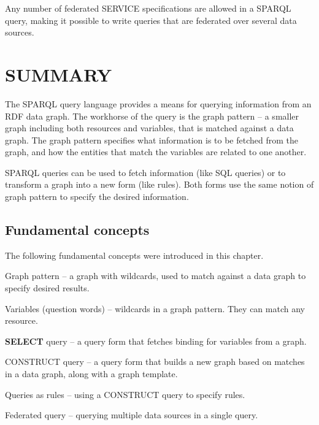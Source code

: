 Any number of federated SERVICE specifications are allowed in a SPARQL
query, making it possible to write queries that are federated over
several data sources.

\section{SUMMARY}

The SPARQL query language provides a means for querying information from
an RDF data graph. The workhorse of the query is the graph pattern -- a
smaller graph including both resources and variables, that is matched
against a data graph. The graph pattern specifies what information is to
be fetched from the graph, and how the entities that match the variables
are related to one another.

SPARQL queries can be used to fetch information (like SQL queries) or to
transform a graph into a new form (like rules). Both forms use the same
notion of graph pattern to specify the desired information.

\subsection{Fundamental concepts}

The following fundamental concepts were introduced in this chapter.

Graph pattern -- a graph with wildcards, used to match against a data
graph to specify desired results.

Variables (question words) -- wildcards in a graph pattern. They can
match any resource.

\textbf{SELECT} query -- a query form that fetches binding for variables from a
graph.

CONSTRUCT query -- a query form that builds a new graph based on matches
in a data graph, along with a graph template.

Queries as rules -- using a CONSTRUCT query to specify rules.

Federated query -- querying multiple data sources in a single query.

